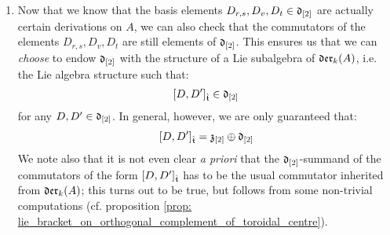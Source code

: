 \begin{remark}
\begin{enumerate}
                \item Now that we know that the basis elements $D_{r, s}, D_v, D_t \in \mathfrak{d}_{[2]}$ are actually certain derivations on $A$, we can also check that the commutators of the elements $D_{r, s}, D_v, D_t$ are still elements of $\mathfrak{d}_{[2]}$. This ensures us that we can \textit{choose} to endow $\mathfrak{d}_{[2]}$ with the structure of a Lie subalgebra of $\mathfrak{der}_{k}(A)$, i.e. the Lie algebra structure such that:
                    $$[D, D']_{\hat{\mathfrak{t}}} \in \mathfrak{d}_{[2]}$$
                for any $D, D' \in \mathfrak{d}_{[2]}$. In general, however, we are only guaranteed that:
                    $$[D, D']_{\hat{\mathfrak{t}}} = \mathfrak{z}_{[2]} \oplus \mathfrak{d}_{[2]}$$
                We note also that it is not even clear \textit{a priori} that the $\mathfrak{d}_{[2]}$-summand of the commutators of the form $[D, D']_{\hat{\mathfrak{t}}}$ has to be the usual commutator inherited from $\mathfrak{der}_{k}(A)$; this turns out to be true, but follows from some non-trivial computations (cf. proposition \ref{prop: lie_bracket_on_orthogonal_complement_of_toroidal_centre}). 
            \end{enumerate}
        \end{remark}
        
